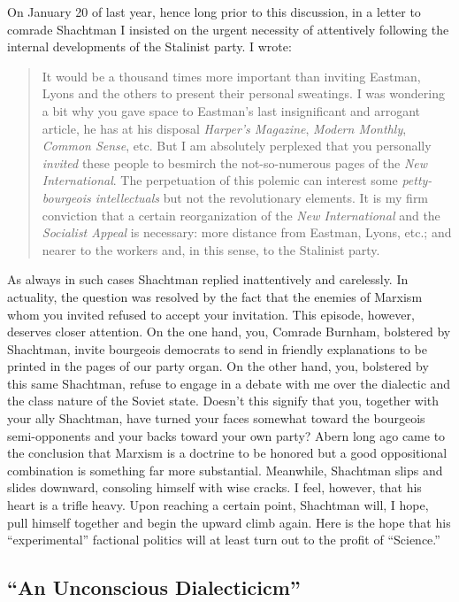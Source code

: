 On January 20 of last year, hence long prior to this discussion, in a letter to comrade Shachtman I insisted on the urgent necessity of attentively following the internal developments of the Stalinist party. I wrote:

\begin{quote}
  It would be a thousand times more important than inviting Eastman, Lyons and the others to present their personal sweatings. I was wondering a bit why you gave space to Eastman’s last insignificant and arrogant article, he has at his disposal \emph{Harper’s Magazine}, \emph{Modern Monthly}, \emph{Common Sense}, etc. But I am absolutely perplexed that you personally \emph{invited} these people to besmirch the not-so-numerous pages of the \emph{New International}. The perpetuation of this polemic can interest some \emph{petty-bourgeois intellectuals} but not the revolutionary elements. It is my firm conviction that a certain reorganization of the \emph{New International} and the \emph{Socialist Appeal} is necessary: more distance from Eastman, Lyons, etc.; and nearer to the workers and, in this sense, to the Stalinist party.
\end{quote}

As always in such cases Shachtman replied inattentively and carelessly. In actuality, the question was resolved by the fact that the enemies of Marxism whom you invited refused to accept your invitation. This episode, however, deserves closer attention. On the one hand, you, Comrade Burnham, bolstered by Shachtman, invite bourgeois democrats to send in friendly explanations to be printed in the pages of our party organ. On the other hand, you, bolstered by this same Shachtman, refuse to engage in a debate with me over the dialectic and the class nature of the Soviet state. Doesn’t this signify that you, together with your ally Shachtman, have turned your faces somewhat toward the bourgeois semi-opponents and your backs toward your own party? Abern long ago came to the conclusion that Marxism is a doctrine to be honored but a good oppositional combination is something far more substantial. Meanwhile, Shachtman slips and slides downward, consoling himself with wise cracks. I feel, however, that his heart is a trifle heavy. Upon reaching a certain point, Shachtman will, I hope, pull himself together and begin the upward climb again. Here is the hope that his “experimental” factional politics will at least turn out to the profit of “Science.”

\subsection*{“An Unconscious Dialecticicm”}

